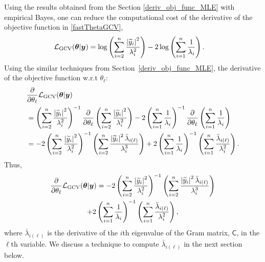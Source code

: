 \documentclass{svjour3}                     %
\newcommand{\bm}[1]{\boldsymbol{#1}}
\newcommand{\vtheta}{{\bm{\theta}}}
\newcommand{\vy}{\bm{y}}
\newcommand{\mC}{\mathsf{C}}
\newcommand{\GCV}{\textup{GCV}}
\def\abs#1{\ensuremath{\left \lvert #1 \right \rvert}}
\newcommand\secref{Section~\ref}
\begin{document}
Using the results obtained from the Section \ref{deriv_obj_func_MLE} with empirical Bayes, one can reduce the computational cost of the derivative of the objective function in \eqref{fastThetaGCV},
\begin{align*}
\mathcal{L}_\GCV(\vtheta | \vy)
&= \log \left ( \sum_{i=2}^n \frac{\abs{\widetilde{y}_i}^2}{\lambda_i^2} 
\right) -2\log\left( \sum_{i=1}^n \frac{1}{\lambda_i} \right).
\end{align*}
Using the similar techniques from \secref{deriv_obj_func_MLE}, the derivative of the objective function w.r.t $\theta_\ell$:
\begin{align*}
& \frac{\partial}{\partial \theta_\ell}  \mathcal{L}_\GCV(\vtheta | \vy)
\\
&= \left ( \sum_{i=2}^n \frac{\abs{\widetilde{y}_i}^2}{\lambda_i^2} \right)^{-1}
\frac{\partial}{\partial \theta_\ell} \left ( \sum_{i=2}^n \frac{\abs{\widetilde{y}_i}^2}{\lambda_i^2} \right)
-2 \left( \sum_{i=1}^n \frac{1}{\lambda_i} \right)^{-1}
\frac{\partial}{\partial \theta_\ell} \left( \sum_{i=1}^n \frac{1}{\lambda_i} \right)
\\
&= -2 \left ( \sum_{i=2}^n \frac{\abs{\widetilde{y}_i}^2}{\lambda_i^2} \right)^{-1}
\left ( \sum_{i=2}^n \frac{\abs{\widetilde{y}_i}^2 \bar{\lambda}_{i(\ell)} }{\lambda_i^3}    \right)
+ 2 \left( \sum_{i=1}^n \frac{1}{\lambda_i} \right)^{-1}
\left( \sum_{i=1}^n \frac{\bar{\lambda}_{i(\ell)} }{\lambda_i^2}  \right).
\end{align*}
Thus,
\begin{multline}
\frac{\partial}{\partial \theta_\ell}  \mathcal{L}_\GCV(\vtheta | \vy)
\label{eqn:deriv_obj_func_full}
= -2 \left ( \sum_{i=2}^n \frac{\abs{\widetilde{y}_i}^2}{\lambda_i^2} \right)^{-1}
\left ( \sum_{i=2}^n \frac{\abs{\widetilde{y}_i}^2 \bar{\lambda}_{i(\ell)} }{\lambda_i^3}    \right) \\
+ 2 \left( \sum_{i=1}^n \frac{1}{\lambda_i} \right)^{-1}
\left( \sum_{i=1}^n \frac{\bar{\lambda}_{i(\ell)} }{\lambda_i^2}  \right),
\end{multline}
where $\bar{\lambda}_{i(\ell)}$ is the derivative of the $i$th eigenvalue of the Gram matrix, $\mC$, in the $\ell$th variable. We discuss a technique to compute $\bar{\lambda}_{i(\ell)}$ in the next section below.
\end{document}
